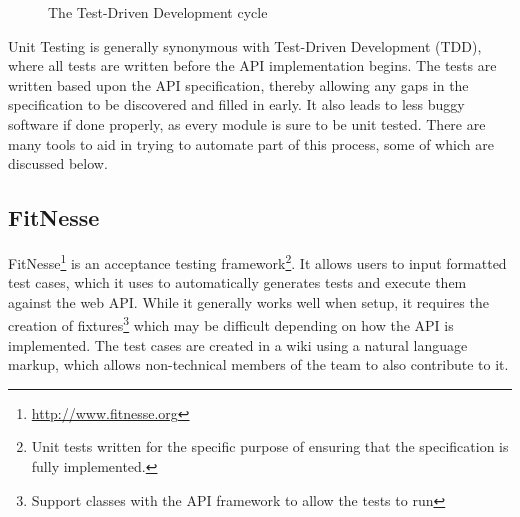 \begin{figure}[ht]
\caption{The Test-Driven Development cycle}
\end{figure}


Unit Testing is generally synonymous with Test-Driven Development (TDD), where all tests are written before the API implementation begins. The tests are written based upon the API specification, thereby allowing any gaps in the specification to be discovered and filled in early. It also leads to less buggy software if done properly, as every module is sure to be unit tested. There are many tools to aid in trying to automate part of this process, some of which are discussed below.

\subsection{FitNesse}

FitNesse\footnote{\url{http://www.fitnesse.org}} is an acceptance testing framework\footnote{Unit tests written for the specific purpose of ensuring that the specification is fully implemented.}. It allows users to input formatted test cases, which it uses to automatically generates tests and execute them against the web API. While it generally works well when setup, it requires the creation of fixtures\footnote{Support classes with the API framework to allow the tests to run} which may be difficult depending on how the API is implemented. The test cases are created in a wiki using a natural language markup, which allows non-technical members of the team to also contribute to it.

